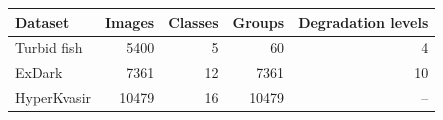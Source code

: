 \begin{tabular}{lrrrr}
\toprule
Dataset & Images & Classes & Groups & Degradation levels \\
\midrule
Turbid fish & 5400 & 5 & 60 & 4 \\
ExDark & 7361 & 12 & 7361 & 10 \\
HyperKvasir & 10479 & 16 & 10479 & -- \\
\bottomrule
\end{tabular}